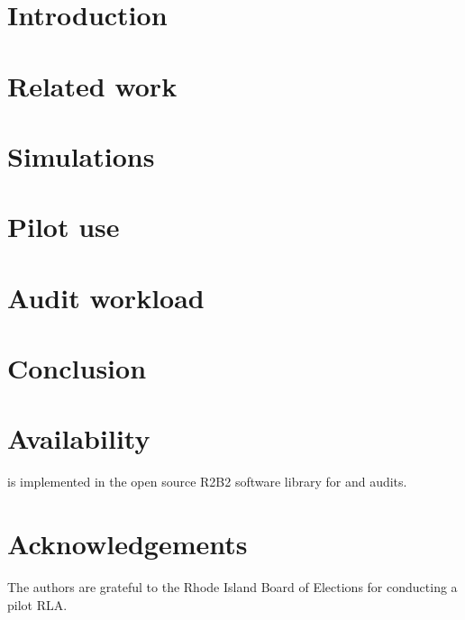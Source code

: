 \section{Introduction}
\label{sec:intro}


\section{Related work}
\label{sec:related}


\section{\Providence}
\label{sec:prov}


\section{Simulations}
\label{sec:sims}


\section{Pilot use}
\label{sec:pilot}


\section{Audit workload}
\label{sec:workload}


\section{Conclusion}
\label{sec:conc}


\section{Availability}
\label{sec:avail}
\Providence is implemented in the open source R2B2 software library for \R and \B audits.\cite{r2b2}

\section{Acknowledgements}
\label{sec:ack}
The authors are grateful to the Rhode Island Board of Elections for conducting a pilot \Providence RLA. 

